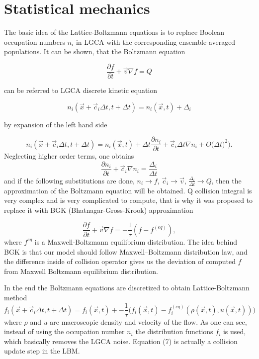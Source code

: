 
\section{Statistical mechanics}

The basic idea of the Lattice-Boltzmann equations is to replace Boolean occupation numbers $n_i$ in LGCA with the corresponding ensemble-averaged populations. It can be shown, that the Boltzmann equation

\begin{equation}
\frac{\partial f}{\partial t} + \vec{v} \nabla f = Q
\end{equation}

can be referred to LGCA discrete kinetic equation

\begin{equation}
n_i(\vec{x} + \vec{c}_i \Delta t, t + \Delta t) = n_i(\vec{x},t) +\Delta_i
\end{equation}

by expansion of the left hand side

\begin{equation}
n_i(\vec{x} + \vec{c}_i \Delta t, t + \Delta t) = n_i(\vec{x},t) + \Delta t \frac{\partial n_i}{\partial t} + \vec{c}_i \Delta{t} \nabla{n_i} + O\big(\Delta t)^2\big).
\end{equation}
Neglecting higher order terms, one obtains
\begin{equation}
\frac{\partial n_i}{\partial t} + \vec{c}_i \nabla{n_i} = \frac{\Delta_i}{\Delta t}
\end{equation}
and if the following  substitutions are done, $n_i \rightarrow f$, $\vec{c}_i \rightarrow \vec{v}$, $\frac{\Delta_i}{\Delta t} \rightarrow Q$, then the approximation of the Boltzmann equation will be obtained. Q collision integral is very complex and is very complicated to compute, that is why it was proposed to replace it with BGK (Bhatnagar-Gross-Krook) approximation

\begin{equation}
\frac{\partial f}{\partial t} + \vec{v} \nabla f = -\frac{1}{\tau}(f - f^{(eq)}),
\end{equation}
where $f^{eq}$ is a Maxwell-Boltzmann equilibrium distribution. The idea behind BGK is that our model should follow Maxwell–Boltzmann distribution law, and the difference inside of collision operator gives us the deviation of computed $f$ from Maxwell Boltzmann equilibrium distribution.

In the end the  Boltzmann equations are discretized to obtain Lattice-Boltzmann method
\begin{equation}
f_i(\vec{x} + \vec{c}_i \Delta t, t + \Delta t) = f_i(\vec{x},t) + -\frac{1}{\tau} \big(f_i(\vec{x},t) - f_i^{(eq)}(\rho(\vec{x},t), u(\vec{x},t))\big)
\end{equation}
where $\rho$ and $u$ are macroscopic density and velocity of the flow. As one can see, instead of using the occupation number $n_i$ the distribution functions $f_i$ is used, which basically removes the LGCA noise. Equation (7) is actually a collision update step in the LBM.

